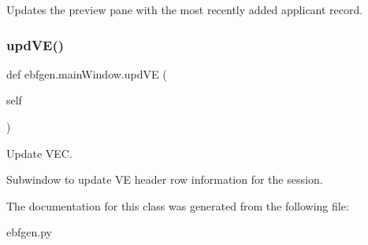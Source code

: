 Updates the preview pane with the most recently added applicant record. \mbox{\label{classebfgen_1_1mainWindow_a788d4b2795b776cc1cf98e8f1595d919}} 
\subsubsection{\texorpdfstring{upd\+V\+E()}{updVE()}}
{\footnotesize\ttfamily def ebfgen.\+main\+Window.\+upd\+VE (\begin{DoxyParamCaption}\item[{}]{self }\end{DoxyParamCaption})}



Update V\+EC. 

Subwindow to update VE header row information for the session. 

The documentation for this class was generated from the following file\+:\begin{DoxyCompactItemize}
\item 
ebfgen.\+py\end{DoxyCompactItemize}
